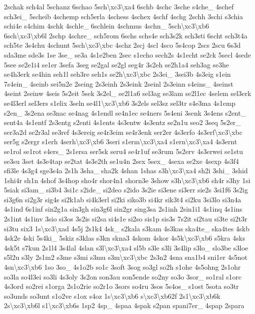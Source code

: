 \begin{DoxyCompactItemize}
2schak sch4al 5schanz 6schao 5sch\textbackslash{}xc3\textbackslash{}xa4 6schb 4schc 3sche s4che\-\_\- 4schef sch3ei\-\_\- 5scheib 4schemp sch5erla 4schess 4schex 4schf 4schg 2schh 3schi s3chia schi4e s4chim 4schk 4schle\-\_\- 6schlein 4schmus 4schn\-\_\- 5sch\textbackslash{}xc3\textbackslash{}xb6 6sch\textbackslash{}xc3\textbackslash{}xb6l 2schp 4schre\-\_\- sch5rom 6schs schs4e sch3s2k sch3sti 6scht sch3t4a sch5te 3s4chu 4schunt 5sch\textbackslash{}xc3\textbackslash{}xbc 4schz 2scj 4scl 4sco 5s4cop 2scs 2scu 6s3d sda3me sde3s 1se 3se\-\_\- se3a 4s1e2ben 2sec s1echo sech2s 4s1echt se2ck 5secl 4sede 5see se2e1i4 se1er 3sefa 3seg se2gal se2gl seg4r 3s2eh se2h1a4 seh3ag se3he se4h3erk se4hin seh1l seh3re seh1s se2h\textbackslash{}xc3\textbackslash{}xbc 2s3ei\-\_\- 3sei3b 4s3eig s1ein 7s4ein\-\_\- 4seinb sei5n2e 2seing 2s3einh 2s3eink 2seinl 2s3einn s4eins\-\_\- 4seinst 4seint 2seinw 4seis 5s2eit 5sek 3s2el\-\_\- se2l1a6 sel3ag se3lam se2l1ec 4selem sel3erk se4l3erl sel3ers s1elix 3seln se4l1\textbackslash{}xc3\textbackslash{}xb6 3s2els sel3sz sel3tr s4e3ma 4s1emp s2en\-\_\- 3s2ena se3nac se4nag 4s1endl se4n1ec se4ners 5s4eni 3senk 3s4ens s2ent\-\_\- sent4a 4s1entf 2s3entg s2enti 4s1ents 4s3entw 4s3entz se2n1u seo2 3seq 5s2er\-\_\- ser3a2d se2r3al se3ref 4s3ereig se4r3eim se4r3enk ser2er 4s3erfo 4s3erf\textbackslash{}xc3\textbackslash{}xbc ser5g s2ergr s1erh 4serh\textbackslash{}xc3\textbackslash{}xb6 3seri s1erm\textbackslash{}xc3\textbackslash{}xa4 s1ern\textbackslash{}xc3\textbackslash{}xa4 4s3ernt se1rol se1rot s4ers\-\_\- 2s1ersa ser5sk seru4 se4r1uf se3rum 5s2erv 4s3erwei se1stu se3su 3set 4s3e4tap se2tat 4s3e2th se1u4n 2sex 5sex\-\_\- 4sexa se2xe 4sexp 4s3f4 sfi3le 4s3g4 sge3s4a 2s1h 3sha\-\_\- sha2k 4shan 1shas s3h\textbackslash{}xc3\textbackslash{}xa4 sh2i 3shi\-\_\- 3shid 1shi4r sh1n 4shof 3s4hop sho4r shor4n1 shorn3e 3show s3h\textbackslash{}xc3\textbackslash{}xb6 sh4r s3hy 1si 5siak si3am\-\_\- si3b4 3si1c s2ide\-\_\- si2deo s2ido 3s2ie si3ene si3err sie2s 3si1f6 3s2ig si3g6n si2g3r sig4s si2k1ab si4k3erl si2ki siko3b si4kr sik3t4 si2ku 3si3lo si3n4a 4s1ind 6s1inf sin2g1a sin3gh sin3g6l sin2gr sing3sa 2s1inh 2sin1i1 4s1inq 4s1ins 2s1int 4s1inv 3sio si3os 3s2is si2sa si4s1e si2so sis1p sis3s 7s2it si2tau si3te si2t3r si3tu six3 1s\textbackslash{}xc3\textbackslash{}xad 4s5j 2s1k4 4sk\-\_\- s2kala s3kam 4s3kas ska4te\-\_\- ska4tes 4skb 4sk2e 4ski 5s4ki\-\_\- 5skiz s3klas s3kn skna3 4skom 4skor 4s5k\textbackslash{}xc3\textbackslash{}xb6 s5kra 4sks 4sk5t s7kun 2s1l4 3s4lal 4slan s3l\textbackslash{}xc3\textbackslash{}xa4 sl5b s3le s3li 3s4lip s3lo\-\_\- slo3be s3loe s5l2u s3ly 2s1m2 s3me s3mi s3mu s3m\textbackslash{}xc3\textbackslash{}xbc 2s3n2 4sna sna1b4 sni1er 4s5not 4sn\textbackslash{}xc3\textbackslash{}xb6 1so 3so\-\_\- 4s1o2b so1c 3soft 3sog so3gl so2h s1ohe 4s5ohng 2s1ohr so3la so4l3ei so3li 4s3oly 3s2on son3au son5ende so2ny so3o 3sor\-\_\- so1ral s1orc 4s3ord so2rei s1orga 2s1o2rie so2r1o 3sors so4ru 3sos 5s4os\-\_\- s1ost 5sota so3tr so3unds so3unt s1o2ve s1ox s4oz 1s\textbackslash{}xc3\textbackslash{}xb6 s\textbackslash{}xc3\textbackslash{}xb62f 2s1\textbackslash{}xc3\textbackslash{}xb6k 2s\textbackslash{}xc3\textbackslash{}xb6l s1\textbackslash{}xc3\textbackslash{}xb6s 1sp2 4sp\-\_\- 4spaa 4spak s2pan spani7er\-\_\- 4spap 2spara 
\end{DoxyCompactItemize}
